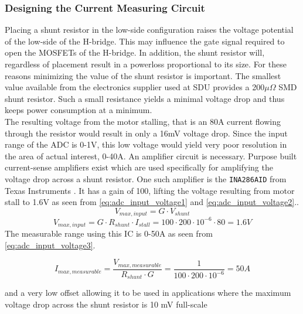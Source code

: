 \subsubsection{Designing the Current Measuring Circuit}
Placing a shunt resistor in the low-side configuration raises the voltage potential of the low-side of the H-bridge.
This may influence the gate signal required to open the MOSFETs of the H-bridge.
In addition, the shunt resistor will, regardless of placement result in a powerloss proportional to its size.
For these reasons minimizing the value of the shunt resistor is important. 
The smallest value available from the electronics supplier used at SDU provides a 200$\mu\Omega$ SMD shunt resistor.
Such a small resistance yields a minimal voltage drop and thus keeps power consumption at a minimum.\\
The resulting voltage from the motor stalling, that is an 80A current flowing through the resistor would result in only a 16mV voltage drop.
Since the input range of the ADC is 0-1V, this low voltage would yield very poor resolution in the area of actual interest, 0-40A.
An amplifier circuit is necessary.
Purpose built current-sense amplifiers exist which are used specifically for amplifying the voltage drop across a shunt resistor.
One such amplifier is the \texttt{INA286AID} from Texas Instruments \cite{INA286AID}.
It has a gain of 100, lifting the voltage resulting from motor stall to 1.6V as seen from \ref{eq:adc_input_voltage1} and \ref{eq:adc_input_voltage2}..
\begin{equation}
	V_{max,input} = G \cdot V_{shunt}
	\label{eq:adc_input_voltage1}
\end{equation}
\begin{equation}
	V_{max,input} = G \cdot R_{shunt} \cdot I_{stall} = 100 \cdot 200\cdot10^{-6} \cdot 80 = 1.6V
	\label{eq:adc_input_voltage2}
\end{equation}
The measurable range using this IC is 0-50A as seen from \ref{eq:adc_input_voltage3}.

\begin{equation}
	I_{max, measurable} = \frac{V_{max, measurable}}{R_{shunt}\cdot G} = \frac{1}{100 \cdot 200\cdot10^{-6} } = 50A
	\label{eq:adc_input_voltage3}
\end{equation}

and a very low offset allowing it to be used in applications where the maximum voltage drop across the shunt resistor is 10 mV full-scale 

